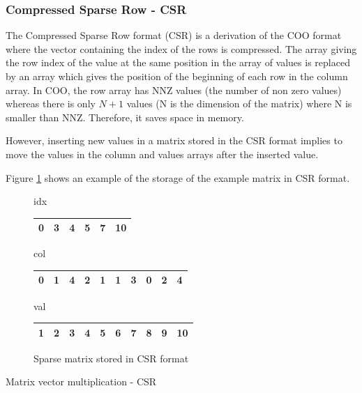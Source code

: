 \subsubsection{Compressed Sparse Row - CSR}
The Compressed Sparse Row format (CSR) \cite{HacBG1971} \cite{Gusta1972} is a derivation of the COO format where the vector containing the index of the rows is compressed.
The array giving the row index of the value at the same position in the array of values is replaced by an array which gives the position of the beginning of each row in the column array.
In COO, the row array has NNZ values (the number of non zero values) whereas there is only $N+1$ values (N is the dimension of the matrix) where N is smaller than NNZ.
Therefore, it saves space in memory.

However, inserting new values in a matrix stored in the CSR format implies to move the values in the column and values arrays after the inserted value.

Figure \ref{fig:methods:csr_ex} shows an example of the storage of the example matrix in CSR format.

\begin{figure}
\centering
idx
\bigskip
\begin{tabular}{|cccccc|}
\hline
0 & 3 & 4 & 5 & 7 & 10 \\
\hline
\end{tabular}

col
\bigskip
\begin{tabular}{|cccccccccc|}
\hline
0 & 1 & 4 & 2 & 1 & 1 & 3 & 0 & 2 & 4 \\
\hline
\end{tabular}

val
\bigskip
\begin{tabular}{|cccccccccc|}
\hline
1 & 2 & 3 & 4 & 5 & 6 & 7 & 8 & 9 & 10 \\
\hline
\end{tabular}
\caption{Sparse matrix stored in CSR format \label{fig:methods:csr_ex}}
\end{figure}


\begin{algorithm}[h]
	\DontPrintSemicolon
	\caption{Matrix vector multiplication - CSR\label{fig:methods:csr_algo}}
\end{algorithm}


